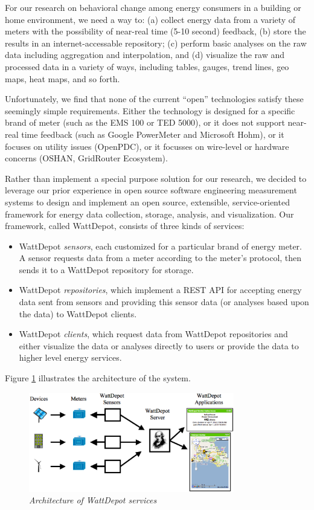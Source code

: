 \documentclass[conference,compsoc]{IEEEtran}
\begin{document}
For our research on behavioral change among energy consumers in a building
or home environment, we need a way to: (a) collect energy data from a
variety of meters with the possibility of near-real time (5-10 second)
feedback, (b) store the results in an internet-accessable repository; (c)
perform basic analyses on the raw data including aggregation and
interpolation, and (d) visualize the raw and processed data in a variety of
ways, including tables, gauges, trend lines, geo maps, heat maps, and so forth.

Unfortunately, we find that none of the current ``open'' technologies
satisfy these seemingly simple requirements. Either the technology is
designed for a specific brand of meter (such as the EMS 100 or TED 5000), or it does not
support near-real time feedback (such as Google PowerMeter and Microsoft
Hohm), or it focuses on utility issues (OpenPDC), or it focusses on
wire-level or hardware concerns (OSHAN, GridRouter Ecosystem).

Rather than implement a special purpose solution for our research, we
decided to leverage our prior experience in open source software
engineering measurement systems to design and implement an open source,
extensible, service-oriented framework for energy data collection, storage,
analysis, and visualization. Our framework, called WattDepot, consists of
three kinds of services:

\begin{itemize}
\item WattDepot {\em sensors}, each customized for a particular brand of
energy meter.  A sensor requests data from a meter according to the meter's
protocol, then sends it to a WattDepot repository for storage.

\item WattDepot {\em repositories}, which implement a REST \cite{REST} API
for accepting energy data sent from sensors and providing this sensor data
(or analyses based upon the data) to WattDepot clients.

\item WattDepot {\em clients}, which request data from WattDepot
repositories and either visualize the data or analyses directly to users or
provide the data to higher level energy services.
\end{itemize}

Figure \ref{fig:architecture} illustrates the architecture of the system.

\begin{figure}[!th]
  \center
  \includegraphics[width=0.8\textwidth]{architecture.eps}
  \caption{\em \small Architecture of WattDepot services}
  \label{fig:architecture}
\end{figure} 
\end{document}
